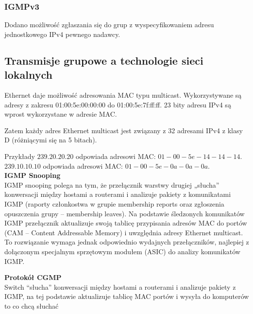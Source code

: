 \documentclass[../main.tex]{subfiles}
\begin{document}
    \subsubsection{IGMPv3}

    Dodano możliwość zgłaszania się do grup z wyspecyfikowaniem adresu
    jednostkowego IPv4 pewnego nadawcy.


    \subsection{Transmisje grupowe a technologie sieci lokalnych}

    Ethernet daje możliwość adresowania MAC typu multicast. Wykorzystywane są adresy z
    zakresu 01:00:5e:00:00:00 do 01:00:5e:7f:ff:ff. 23 bity adresu IPv4 są wprost wykorzystane w
    adresie MAC.

    Zatem każdy adres Ethernet multicast jest związany z 32 adresami IPv4 z klasy D (różniącymi
    się na 5 bitach).

    Przykłady
    $239.20.20.20$ odpowiada adresowi MAC: $01-00-5e-14-14-14$.\\
    $239.10.10.10$ odpowiada adresowi MAC: $01-00-5e-0a-0a-0a$.\\


    \textbf{IGMP Snooping}\\
    IGMP snooping polega na tym, że przełącznik warstwy drugiej „słucha” konwersacji między
    hostami a routerami i analizuje pakiety z komunikatami IGMP (raporty członkostwa w grupie
    membership reports oraz zgłoszenia opuszczenia grupy – membership leaves). Na podstawie
    śledzonych komunikatów IGMP przełącznik aktualizuje swoją tablicę przypisania adresów
    MAC do portów (CAM – Content Addressable Memory) i uwzględnia adresy Ethernet
    multicast.
    To rozwiązanie wymaga jednak odpowiednio wydajnych przełączników, najlepiej z
    dołączonym specjalnym sprzętowym modułem (ASIC) do analizy komunikatów IGMP.


    \textbf{Protokół CGMP}\\
    Switch “słucha” konwersacji między hostami a routerami i analizuje pakiety z IGMP, na tej podstawie aktualizuje tablicę MAC portów i wysyła do komputerów to co chcą słuchać
\end{document}
